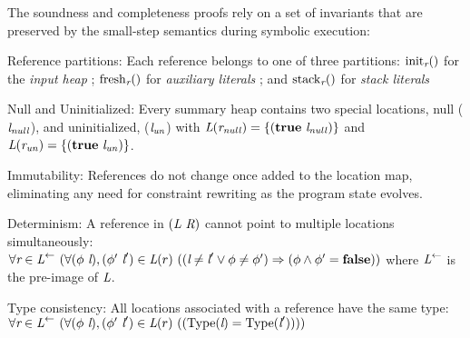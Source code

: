 The soundness and completeness proofs  rely on a set of 
invariants  that
are preserved by the small-step semantics during symbolic execution:
\begin{compactdesc}
\item[Reference partitions:] Each reference belongs to one of three partitions: $\mathrm{init}_{\emph{r}}()$ for the \emph{input
  heap}%
  ; $\mathrm{fresh}_{\emph{r}}()$ for \emph{auxiliary
  literals}%
  ; and $\mathrm{stack}_{\emph{r}}()$ for \emph{stack
  literals} %
\item[Null and Uninitialized:] Every summary heap contains 
two special locations, null ($\emph{l}_\mathit{null}$), and uninitialized,
  ($\emph{l}_\mathit{un}$) with $\emph{L}(\emph{r}_\mathit{null}) =
  \{(\textbf{true}\ \emph{l}_\mathit{null})\}$ and
  $\emph{L}(\emph{r}_\mathit{un}) =
  \{(\textbf{true}\ \emph{l}_\mathit{un})\}$. 
\item[Immutability:] References do not change once added to the
location map, eliminating any need for constraint rewriting as the program state evolves.
\item[Determinism:] A reference in $(\emph{L}\ \emph{R})$ cannot point to multiple locations simultaneously: 
$
\forall \cfgnt{r} \in \cfgnt{L}^\leftarrow\ (\forall (\phi\ \cfgnt{l}),(\phi^\prime\ \cfgnt{l}^\prime) \in \cfgnt{L}(r)\ (
(\cfgnt{l} \neq \cfgnt{l}^\prime \vee \phi \neq \phi^\prime) \Rightarrow (\phi \wedge \phi^\prime = \cfgt{false}))
$
where $\emph{L}^\leftarrow$ is the pre-image of $\emph{L}$. 
\item[Type consistency:] All locations associated with a reference have the same type:
$\forall \cfgnt{r} \in \cfgnt{L}^\leftarrow\ (\forall (\phi\ \cfgnt{l}),(\phi^\prime\ \cfgnt{l}^\prime) \in \cfgnt{L}(r)\ (
(\mathrm{Type}\lp\cfgnt{l}\rp = \mathrm{Type}\lp\cfgnt{l}^\prime\rp)))$

\end{compactdesc}
